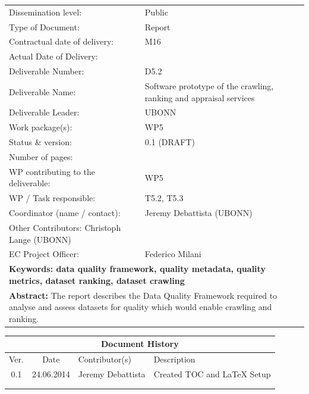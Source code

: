 \documentclass[a4paper]{article}
\begin{document}
\begin{titlepage}
\begin{center}
  \begin{tabular}{@{}|ll|}
    \hline
    Dissemination level:  & Public\\
    Type of Document:  & Report \\
    Contractual date of delivery: & M16\\
    Actual Date of Delivery:  & \\
    Deliverable Number: & D5.2\\
    Deliverable Name: & Software prototype of the crawling, ranking and appraisal services\\
    Deliverable Leader: & UBONN\\
    Work package(s): & WP5\\ 
    Status \& version: & 0.1 (DRAFT)\\
    Number of pages: & \\
    WP contributing to the deliverable: & WP5 \\  
    WP / Task responsible: & T5.2, T5.3\\ 
    Coordinator (name / contact): & Jeremy Debattista (UBONN) \\  
    Other Contributors: Christoph Lange (UBONN) & \\
    EC Project Officer: & Federico Milani \\
    \multicolumn{2}{|p{15cm}|}{\cellcolor{gray!20}
      \textbf{Keywords: data quality framework, quality metadata, quality metrics, dataset ranking, dataset crawling} 
    } \\
    \multicolumn{2}{|p{15cm}|}{\cellcolor{gray!50}
      \textbf{Abstract:} \newline
      The report describes the Data Quality Framework required to analyse and assess datasets for quality which would enable crawling and ranking.
    } \\
    \hline
  \end{tabular}
\end{center}

\end{titlepage}

\begin{center}
  \begin{tabular}{|c|c|p{6cm}|p{7cm}|}
    \hline
    \multicolumn{4}{|c|}{\cellcolor{CornflowerBlue}Document History} \\
    \hline
    \rowcolor{LightSteelBlue}
    Ver. & Date & Contributor(s) & Description \\
    \hline
    0.1 & 24.06.2014 & Jeremy Debattista & Created TOC and LaTeX Setup \\
    \hline
    & & & \\
    \hline
    & & & \\ 
    \hline
  \end{tabular}
\end{center}
\end{document}
